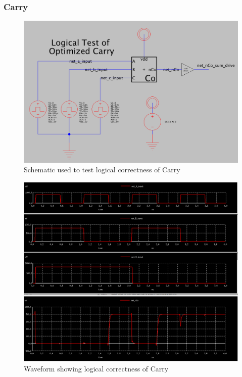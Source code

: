 \documentclass{article}
\begin{document}
\subsubsection{Carry}
\begin{figure}[H]
  \includegraphics[width=\linewidth]{opt_screenshots/test_logic_opt_carry_sch.png}
  \caption{Schematic used to test logical correctness of Carry}
  \label{fig:test_logic_opt_carry_sch}
\end{figure}

\begin{figure}[H]
  \includegraphics[width=\linewidth]{opt_screenshots/test_logic_real_carry_out.png}
  \caption{Waveform showing logical correctness of Carry}
  \label{fig:test_logic_real_carry_out}
\end{figure}
\end{document}
